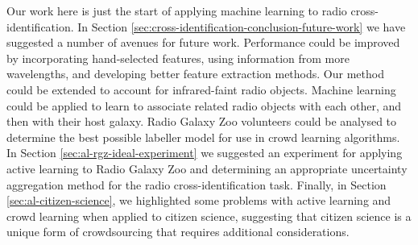    Our work here is just the start of applying machine learning to radio
    cross-\\identification. In Section
    \ref{sec:cross-identification-conclusion-future-work} we have suggested a
    number of avenues for future work. Performance could be improved by
    incorporating hand-selected features, using information from more
    wavelengths, and developing better feature extraction methods. Our method
    could be extended to account for infrared-faint radio objects. Machine
    learning could be applied to learn to associate related radio objects with
    each other, and then with their host galaxy. Radio Galaxy Zoo volunteers
    could be analysed to determine the best possible labeller model for use in
    crowd learning algorithms. In Section \ref{sec:al-rgz-ideal-experiment} we
    suggested an experiment for applying active learning to Radio Galaxy Zoo and
    determining an appropriate uncertainty aggregation method for the radio
    cross-identification task. Finally, in Section \ref{sec:al-citizen-science},
    we highlighted some problems with active learning and crowd learning when
    applied to citizen science, suggesting that citizen science is a unique form
    of crowdsourcing that requires additional considerations.

